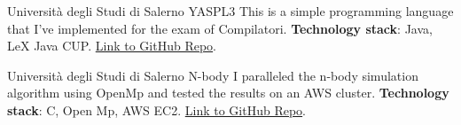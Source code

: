 \documentclass[%
               doublesided,
               paper=a4,
               fontsize=10pt
              ]{my-resume}
\begin{document}
{    
        {Università degli Studi di Salerno}
        {YASPL3}
        {This is a simple programming language that I've implemented for the exam of Compilatori. \textbf{Technology stack}: Java, LeX Java CUP. \href{https://github.com/CiccioTecchio/YASPL3}{Link to GitHub Repo}.}
    
        {Università degli Studi di Salerno}
        {N-body}
        {I paralleled the n-body simulation algorithm using OpenMp and tested the results on an AWS cluster. \textbf{Technology stack}: C, Open Mp, AWS EC2. \href{https://github.com/CiccioTecchio/n-Body_MPI}{Link to GitHub Repo}.}
        
    


    
    
}

\makebody
\end{document}
